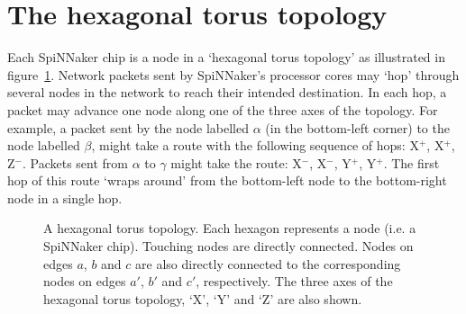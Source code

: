 	
	\section{The hexagonal torus topology}
		
		Each SpiNNaker chip is a node in a `hexagonal torus topology' as
		illustrated in figure~\ref{fig:hexagonalTorusTopology}. Network packets
		sent by SpiNNaker's processor cores may `hop' through several nodes in the
		network to reach their intended destination. In each hop, a packet may
		advance one node along one of the three axes of the topology. For example,
		a packet sent by the node labelled $\alpha$ (in the bottom-left corner) to
		the node labelled $\beta$, might take a route with the following sequence
		of hops: X$^+$, X$^+$, Z$^-$. Packets sent from $\alpha$ to $\gamma$ might
		take the route: X$^-$, X$^-$, Y$^+$, Y$^+$. The first hop of this route
		`wraps around' from the bottom-left node to the bottom-right node in a
		single hop.
		
		\begin{figure}
			\center
			
			\caption[A hexagonal torus topology.]%
			{A hexagonal torus topology. Each hexagon represents a node (i.e.
			a SpiNNaker chip). Touching nodes are directly connected. Nodes on edges
			$a$, $b$ and $c$ are also directly connected to the corresponding nodes
			on edges $a'$, $b'$ and $c'$, respectively. The three axes of the
			hexagonal torus topology, `X', `Y' and `Z' are also shown.}
			\label{fig:hexagonalTorusTopology}
		\end{figure}
		
